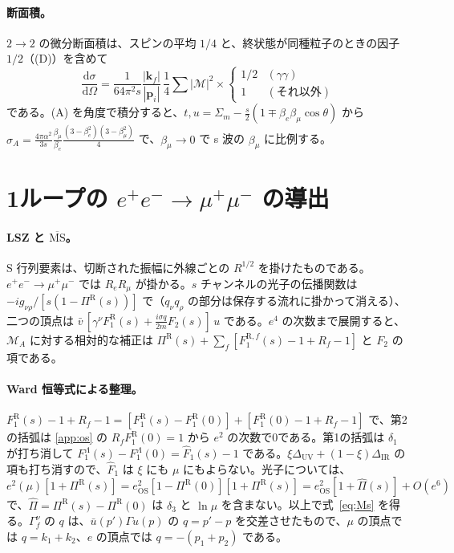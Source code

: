 \documentclass[a4paper,10pt]{ltjsarticle}
\newcommand{\dd}{\mathrm{d}}
\newcommand{\MSbar}{\overline{\mathrm{MS}}}
\newcommand{\DUV}{\Delta_{\mathrm{UV}}}
\newcommand{\DIR}{\Delta_{\mathrm{IR}}}
\begin{document}
\paragraph{断面積。}$2\to2$ の微分断面積は、スピンの平均 $1/4$ と、終状態が同種粒子のときの因子 $1/2$（(D)）を含めて
\begin{equation*}
\frac{\dd\sigma}{\dd\Omega}=\frac{1}{64\pi^2s}\frac{|\boldsymbol k_f|}{|\boldsymbol p_i|}\,\frac14\sum|\mathcal M|^2\times\begin{cases}1/2&(\gamma\gamma)\\1&(\text{それ以外})\end{cases}
\end{equation*}
である。(A) を角度で積分すると、$t,u=\Sigma_m-\frac s2(1\mp\beta_e\beta_\mu\cos\theta)$ から $\sigma_A=\frac{4\pi\alpha^2}{3s}\frac{\beta_\mu}{\beta_e}\frac{(3-\beta_e^2)(3-\beta_\mu^2)}{4}$ で、$\beta_\mu\to0$ で s 波の $\beta_\mu$ に比例する。

\section{1ループの $e^+e^-\to\mu^+\mu^-$ の導出}\label{app:scat}

\paragraph{LSZ と $\MSbar$。}S 行列要素は、切断された振幅に外線ごとの $R^{1/2}$ を掛けたものである。$e^+e^-\to\mu^+\mu^-$ では $R_eR_\mu$ が掛かる。$s$ チャンネルの光子の伝播関数は $-ig_{\nu\rho}/[s(1-\Pi^{\mathrm R}(s))]$ で（$q_\nu q_\rho$ の部分は保存する流れに掛かって消える）、二つの頂点は $\bar v\,[\gamma^\nu F_1^{\mathrm R}(s)+\frac{i\sigma q}{2m}F_2(s)]\,u$ である。$e^4$ の次数まで展開すると、$\mathcal M_A$ に対する相対的な補正は $\Pi^{\mathrm R}(s)+\sum_f[F_1^{\mathrm R,f}(s)-1+R_f-1]$ と $F_2$ の項である。

\paragraph{Ward 恒等式による整理。}$F_1^{\mathrm R}(s)-1+R_f-1=[F_1^{\mathrm R}(s)-F_1^{\mathrm R}(0)]+[F_1^{\mathrm R}(0)-1+R_f-1]$ で、第2の括弧は \ref{app:os} の $R_fF_1^{\mathrm R}(0)=1$ から $e^2$ の次数で0である。第1の括弧は $\delta_1$ が打ち消して $F_1^\Lambda(s)-F_1^\Lambda(0)=\hat F_1(s)-1$ である。$\xi\DUV+(1-\xi)\DIR$ の項も打ち消すので、$\hat F_1$ は $\xi$ にも $\mu$ にもよらない。光子については、$e^2(\mu)[1+\Pi^{\mathrm R}(s)]=e_{\mathrm{OS}}^2[1-\Pi^{\mathrm R}(0)][1+\Pi^{\mathrm R}(s)]=e_{\mathrm{OS}}^2[1+\hat\Pi(s)]+O(e^6)$ で、$\hat\Pi=\Pi^{\mathrm R}(s)-\Pi^{\mathrm R}(0)$ は $\delta_3$ と $\ln\mu$ を含まない。以上で式~\eqref{eq:Ms} を得る。$\Gamma_f^\nu$ の $q$ は、$\bar u(p')\Gamma u(p)$ の $q=p'-p$ を交差させたもので、$\mu$ の頂点では $q=k_1+k_2$、$e$ の頂点では $q=-(p_1+p_2)$ である。
\end{document}
